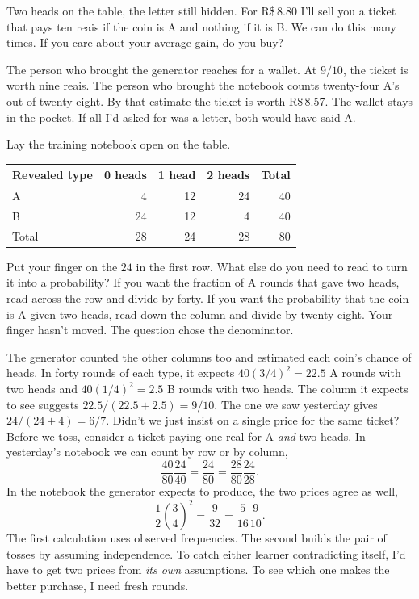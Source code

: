 Two heads on the table, the letter still hidden. For R\$\,8.80 I'll sell you a ticket that pays ten reais if the coin is A and nothing if it is B. We can do this many times. If you care about your average gain, do you buy?

The person who brought the generator reaches for a wallet. At $9/10$, the ticket is worth nine reais. The person who brought the notebook counts twenty-four A's out of twenty-eight. By that estimate the ticket is worth R\$\,8.57. The wallet stays in the pocket. If all I'd asked for was a letter, both would have said A.

Lay the training notebook open on the table.
\begin{center}
\begin{tabular}{lrrrr}
\toprule
Revealed type & 0 heads & 1 head & 2 heads & Total\\
\midrule
A & 4 & 12 & 24 & 40\\
B & 24 & 12 & 4 & 40\\
\midrule
Total & 28 & 24 & 28 & 80\\
\bottomrule
\end{tabular}
\end{center}

Put your finger on the $24$ in the first row. What else do you need to read to turn it into a probability? If you want the fraction of A rounds that gave two heads, read across the row and divide by forty. If you want the probability that the coin is A given two heads, read down the column and divide by twenty-eight. Your finger hasn't moved. The question chose the denominator.

The generator counted the other columns too and estimated each coin's chance of heads. In forty rounds of each type, it expects $40(3/4)^2=22.5$ A rounds with two heads and $40(1/4)^2=2.5$ B rounds with two heads. The column it expects to see suggests $22.5/(22.5+2.5)=9/10$. The one we saw yesterday gives $24/(24+4)=6/7$. Didn't we just insist on a single price for the same ticket? Before we toss, consider a ticket paying one real for A \emph{and} two heads. In yesterday's notebook we can count by row or by column,
\[
        \frac{40}{80}\frac{24}{40}
        =\frac{24}{80}
        =\frac{28}{80}\frac{24}{28}.
\]
In the notebook the generator expects to produce, the two prices agree as well,
\[
        \frac12\left(\frac34\right)^2
        =\frac{9}{32}
        =\frac{5}{16}\frac9{10}.
\]
The first calculation uses observed frequencies. The second builds the pair of tosses by assuming independence. To catch either learner contradicting itself, I'd have to get two prices from \emph{its own} assumptions. To see which one makes the better purchase, I need fresh rounds.

